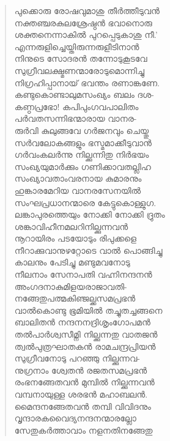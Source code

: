 \begin{verse}
പുക്കൊരു രോഷവുമാശു തീര്‍ത്തീടുവന്‍\\
നക്തഞ്ചരകുലശ്രേഷ്ഠന്‍ ഭവാനൊരു\\
ശക്തനെന്നാകില്‍ പുറപ്പെടുകാശു നീ.’\\
എന്നരുളിച്ചെയ്തിരുന്നരുളീടിനാന്‍\\
നിനുടെ സോദരന്‍ തന്നോടുകൂടവേ\\
സുഗ്രീവലക്ഷ്മണന്മാരോടുമൊന്നിച്ചു\\
നിഗ്രഹിപ്പാനായ് ഭവന്തം രണാങ്കണേ.\\
കണ്ടുകൊണ്ടാലുമസംഖ്യം ബലം ദശ-\\
കണ്ഠപ്രഭോ! കപിപുംഗവപാലിതം\\
പര്‍വതസന്നിഭന്മാരായ വാനര-\\
രുര്‍വി കുലുങ്ങവേ ഗര്‍ജനവും ചെയ്തു\\
സര്‍വലോകങ്ങളും ഭസ്മമാക്കീടുവാന്‍\\
ഗര്‍വംകലര്‍ന്നു നില്ക്കുന്നിതു നിര്‍ഭയം\\
സംഖ്യയുമാര്‍ക്കും ഗണിക്കാവതല്ലിഹ\\
സംഖ്യാവതാംവരനായ കുമാരനും\\
ഹുങ്കാരമേറിയ വാനരസേനയില്‍\\
സംഘപ്രധാനന്മാരെ കേട്ടുകൊള്ളുഗ.\\
ലങ്കാപുരത്തെയും നോക്കി നോക്കി ദ്രുതം\\
ശങ്കാവിഹീനമലറിനില്ക്കുന്നവന്‍\\
നൂറായിരം പടയോടും രിപുക്കളെ\\
നീറാക്കുവാനുഴറ്റോടെ വാല്‍ പൊങ്ങിച്ചു\\
കാലനും പേടിച്ചു മണ്ടുമവനോടു\\
നീലനാം സേനാപതി വഹ്നിനന്ദനന്‍\\
അംഗദനാകുമിളയരാജാവതി-\\
നങ്ങേതുപത്മകിഞ്ജല്ക്കസമപ്രഭന്‍\\
വാല്‍കൊണ്ടു ഭൂമിയില്‍ തച്ചുതച്ചങ്ങനെ\\
ബാലിതന്‍ നന്ദനനദ്രിശൃംഗോപമന്‍\\
തല്‍പാര്‍ശ്വസീമ്നി നില്ക്കുന്നതു വാതജന്‍\\
ത്വല്‍പുത്രഘാതകന്‍ രാമചന്ദ്രപ്രിയന്‍\\
സുഗ്രീവനോടു പറഞ്ഞു നില്ക്കുന്നവ-\\
നുഗ്രനാം ശ്വേതന്‍ രജതസമപ്രഭന്‍\\
രംഭനങ്ങേതവന്‍ മുമ്പില്‍ നില്ക്കുന്നവന്‍\\
വമ്പനായുള്ള ശരഭന്‍ മഹാബലന്‍.\\
മൈന്ദനങ്ങേതവന്‍ തമ്പി വിവിദനും\\
വൃന്ദാരകവൈദ്യനന്ദനന്മാരല്ലോ\\
സേതുകര്‍ത്താവാം നളനതിനങ്ങേതു\\

\end{verse}
